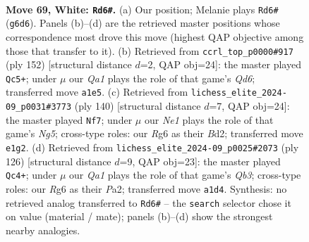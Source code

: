 \documentclass[11pt]{article}
\begin{document}
\clearpage

\begin{figure}[p]\centering
\begin{subfigure}{0.46\textwidth}\centering
\resizebox{\linewidth}{!}{%
\newchessgame
\chessboard[
  setfen={8/8/6R1/8/8/8/3k1K2/Q3N3 w - - 3 69},
  showmover=false,
  pgfstyle=straightmove, color=movearrow, markmove={g6-d6}
]}
\caption{}
\end{subfigure}\hfill
\begin{subfigure}{0.46\textwidth}\centering
\resizebox{\linewidth}{!}{%
\newchessgame
\chessboard[
  setfen={8/8/3Q4/8/3N4/2k1K3/8/8 w - - 7 77},
  showmover=false,
  pgfstyle=straightmove, color=movearrow, markmove={d6-c5}
]}
\caption{}
\end{subfigure}
\\[4pt]
\begin{subfigure}{0.46\textwidth}\centering
\resizebox{\linewidth}{!}{%
\newchessgame
\chessboard[
  setfen={6Q1/8/5K2/6Nk/8/8/3B4/8 w - - 1 71},
  showmover=false,
  pgfstyle=straightmove, color=movearrow, markmove={g5-f7}
]}
\caption{}
\end{subfigure}\hfill
\begin{subfigure}{0.46\textwidth}\centering
\resizebox{\linewidth}{!}{%
\newchessgame
\chessboard[
  setfen={8/8/8/8/4k3/1Q3N2/P5K1/8 w - - 5 64},
  showmover=false,
  pgfstyle=straightmove, color=movearrow, markmove={b3-c4}
]}
\caption{}
\end{subfigure}
\caption{\textbf{Move 69, White: \texttt{Rd6\#}.} (a) Our position; Melanie plays \texttt{Rd6\#} (\texttt{g6d6}). Panels (b)--(d) are the retrieved master positions whose correspondence most drove this move (highest QAP objective among those that transfer to it). (b) Retrieved from \texttt{ccrl\_top\_p0000\#917} (ply 152) [structural distance $d$=2, QAP obj=24]: the master played \texttt{Qc5+}; under $\mu$ our \emph{Qa1} plays the role of that game's \emph{Qd6}; transferred move \texttt{a1e5}. (c) Retrieved from \texttt{lichess\_elite\_2024-09\_p0031\#3773} (ply 140) [structural distance $d$=7, QAP obj=24]: the master played \texttt{Nf7}; under $\mu$ our \emph{Ne1} plays the role of that game's \emph{Ng5}; cross-type roles: our \emph{R}g6 as their \emph{B}d2; transferred move \texttt{e1g2}. (d) Retrieved from \texttt{lichess\_elite\_2024-09\_p0025\#2073} (ply 126) [structural distance $d$=9, QAP obj=23]: the master played \texttt{Qc4+}; under $\mu$ our \emph{Qa1} plays the role of that game's \emph{Qb3}; cross-type roles: our \emph{R}g6 as their \emph{P}a2; transferred move \texttt{a1d4}. Synthesis: no retrieved analog transferred to \texttt{Rd6\#} -- the \texttt{search} selector chose it on value (material / mate); panels (b)--(d) show the strongest nearby analogies.}
\label{fig:thought-m136}
\end{figure}
\end{document}

